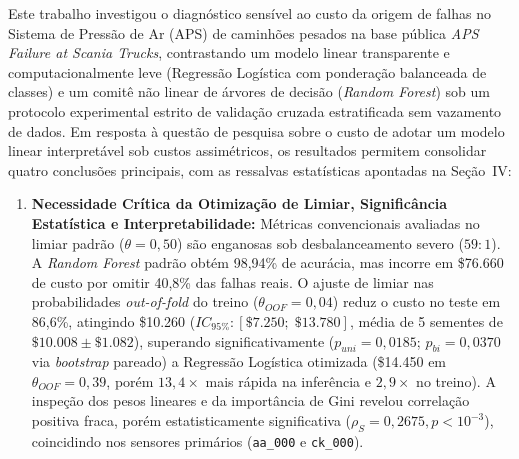 \documentclass[conference]{IEEEtran}
\begin{document}
Este trabalho investigou o diagnóstico sensível ao custo da origem de falhas no Sistema de Pressão de Ar (APS) de caminhões pesados na base pública \textit{APS Failure at Scania Trucks}, contrastando um modelo linear transparente e computacionalmente leve (Regressão Logística com ponderação balanceada de classes) e um comitê não linear de árvores de decisão (\textit{Random Forest}) sob um protocolo experimental estrito de validação cruzada estratificada sem vazamento de dados. Em resposta à questão de pesquisa sobre o custo de adotar um modelo linear interpretável sob custos assimétricos, os resultados permitem consolidar quatro conclusões principais, com as ressalvas estatísticas apontadas na Seção~IV:
\begin{enumerate}
    \item \textbf{Necessidade Crítica da Otimização de Limiar, Significância Estatística e Interpretabilidade:} Métricas convencionais avaliadas no limiar padrão ($\theta = 0{,}50$) são enganosas sob desbalanceamento severo ($59:1$). A \textit{Random Forest} padrão obtém 98,94\% de acurácia, mas incorre em \$76.660 de custo por omitir 40,8\% das falhas reais. O ajuste de limiar nas probabilidades \textit{out-of-fold} do treino ($\theta_{OOF} = 0{,}04$) reduz o custo no teste em 86,6\%, atingindo \$10.260 ($IC_{95\%}: [\$7.250;\; \$13.780]$, média de 5 sementes de $\$10.008 \pm \$1.082$), superando significativamente ($p_{uni} = 0{,}0185$; $p_{bi} = 0{,}0370$ via \textit{bootstrap} pareado) a Regressão Logística otimizada (\$14.450 em $\theta_{OOF} = 0{,}39$, porém $13{,}4\times$ mais rápida na inferência e $2{,}9\times$ no treino). A inspeção dos pesos lineares e da importância de Gini revelou correlação positiva fraca, porém estatisticamente significativa ($\rho_S = 0{,}2675, p < 10^{-3}$), coincidindo nos sensores primários (\texttt{aa\_000} e \texttt{ck\_000}).

\end{enumerate}
\end{document}
